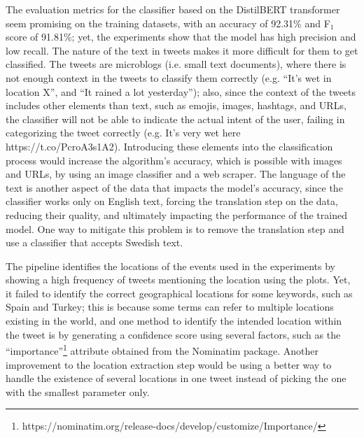 The evaluation metrics for the classifier based on the DistilBERT transformer seem promising on the
training datasets, with an accuracy of 92.31\% and F$_{1}$ score of 91.81\%; yet, the experiments
show that the model has high precision and low recall. The nature of the text in tweets makes it
more difficult for them to get classified. The tweets are microblogs (i.e. small text documents),
where there is not enough context in the tweets to classify them correctly (e.g. ``It's wet in
location X'', and ``It rained a lot yesterday''); also, since the context of the tweets includes
other elements than text, such as emojis, images, hashtags, and \ac{URL}s, the classifier will not
be able to indicate the actual intent of the user, failing in categorizing the tweet correctly (e.g.
It's very wet here https://t.co/PcroA3s1A2). Introducing these elements into the classification
process would increase the algorithm's accuracy, which is possible with images and \ac{URL}s, by
using an image classifier and a web scraper. The language of the text is another aspect of the data
that impacts the model's accuracy, since the classifier works only on English text, forcing the
translation step on the data, reducing their quality, and ultimately impacting the performance of
the trained model. One way to mitigate this problem is to remove the translation step and use a
classifier that accepts Swedish text.

The pipeline identifies the locations of the events used in the experiments by showing a high
frequency of tweets mentioning the location using the plots. Yet, it failed to identify the correct
geographical locations for some keywords, such as Spain and Turkey; this is because some terms can
refer to multiple locations existing in the world, and one method to identify the intended location
within the tweet is by generating a confidence score using several factors, such as the
``importance''\footnote{https://nominatim.org/release-docs/develop/customize/Importance/} attribute
obtained from the Nominatim package. Another improvement to the location extraction step would be
using a better way to handle the existence of several locations in one tweet instead of picking the
one with the smallest parameter only.

